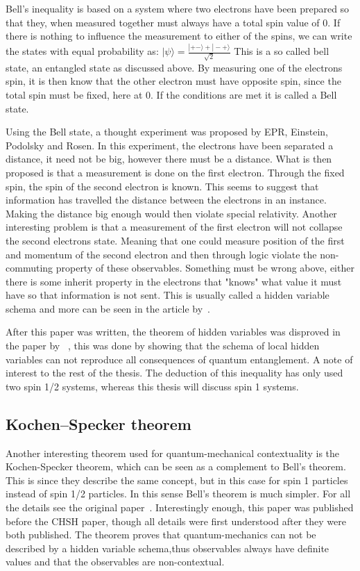 \documentclass[
  utf8,%
  parskip,%
  largesmallcaps,intlimits,widermath,%
  sharecounter,nobreak,definition=marks,%
  noparts%
]{rtthesis}
\begin{document}
Bell's inequality is based on a system where two electrons have been prepared so that they, when measured together must always have a total spin value of 0.
If there is nothing to influence the measurement to either of the spins, we can write the states with equal probability as: $|\psi\rangle = \frac{|+-\rangle + |-+\rangle}{\sqrt{2}}$
This is a so called bell state, an entangled state as discussed above.
By measuring one of the electrons spin, it is then know that the other electron must have opposite spin, since the total spin must be fixed, here at 0. If the conditions are met it is called a Bell state.

Using the Bell state, a thought experiment was proposed by EPR, Einstein, Podolsky and Rosen. In this experiment, the electrons have been separated a distance, it need not be big, however there must be a distance. What is then proposed is that a measurement is done on the first electron. Through the fixed spin, the spin of the second electron is known. This seems to suggest that information has travelled the distance between the electrons in an instance. Making the distance big enough would then violate special relativity. Another interesting problem is that a measurement of the first electron will not collapse the second electrons state. Meaning that one could measure position of the first and momentum of the second electron and then through logic violate the non-commuting property of these observables.
Something must be wrong above, either there is some inherit property in the electrons that "knows" what value it must have so that information is not sent. This is usually called a hidden variable schema and more can be seen in the article by~\cite{PhysRev.47.777}.

After this paper was written, the theorem of hidden variables was disproved in the paper by ~\cite{Bell:1964}, this was done by showing that the schema of local hidden variables can not reproduce all consequences of quantum entanglement. A note of interest to the rest of the thesis. The deduction of this inequality has only used two spin 1/2 systems, whereas this thesis will discuss spin 1 systems.
\subsection{Kochen–Specker theorem}
Another interesting theorem used for quantum-mechanical contextuality is the Kochen-Specker theorem, which can be seen as a complement to Bell's theorem. This is since they describe the same concept, but in this case for spin 1 particles instead of spin 1/2 particles. In this sense Bell's theorem is much simpler. For all the details see the original paper~\cite{Kochen1968The}. Interestingly enough, this paper was published before the CHSH paper, though all details were first understood after they were both published.
The theorem proves that quantum-mechanics can not be described by a hidden variable schema,thus observables always have definite values and that the observables are non-contextual.
\end{document}
